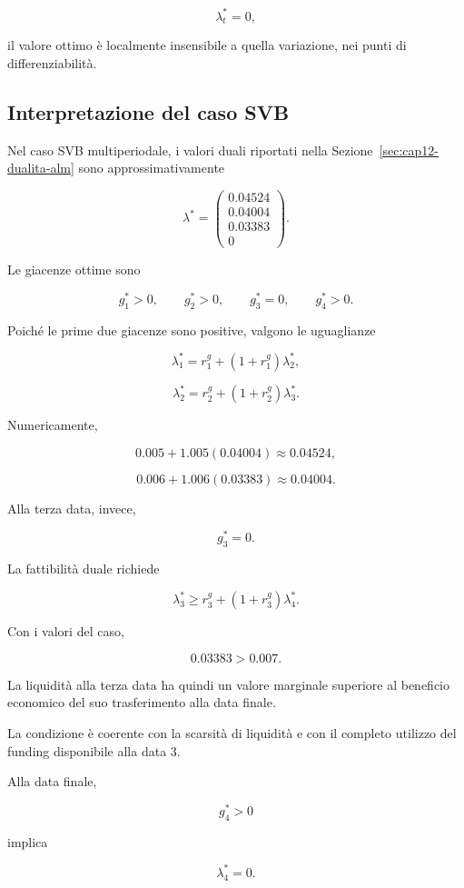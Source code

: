 \[
\lambda_t^*=0,
\]

\noindent il valore ottimo \`{e} localmente
insensibile a quella variazione,
nei punti di differenziabilit\`{a}.

\subsection{Interpretazione del caso SVB}

Nel caso SVB multiperiodale,
i valori duali riportati nella
Sezione~\ref{sec:cap12-dualita-alm}
sono approssimativamente

\[
\lambda^*
=
\begin{pmatrix}
0.04524\\
0.04004\\
0.03383\\
0
\end{pmatrix}.
\]

Le giacenze ottime sono

\[
g_1^*>0,\qquad
g_2^*>0,\qquad
g_3^*=0,\qquad
g_4^*>0.
\]

Poich\'{e} le prime due giacenze
sono positive, valgono le uguaglianze

\[
\lambda_1^*
=
r_1^g+(1+r_1^g)\lambda_2^*,
\]

\[
\lambda_2^*
=
r_2^g+(1+r_2^g)\lambda_3^*.
\]

Numericamente,

\[
0.005+1.005(0.04004)
\approx0.04524,
\]

\[
0.006+1.006(0.03383)
\approx0.04004.
\]

Alla terza data, invece,

\[
g_3^*=0.
\]

La fattibilit\`{a} duale richiede

\[
\lambda_3^*
\geq
r_3^g+(1+r_3^g)\lambda_4^*.
\]

Con i valori del caso,

\[
0.03383>0.007.
\]

La liquidit\`{a} alla terza data
ha quindi un valore marginale
superiore al beneficio economico
del suo trasferimento alla data finale.

La condizione \`{e} coerente
con la scarsit\`{a} di liquidit\`{a}
e con il completo utilizzo del
funding disponibile alla data $3$.

Alla data finale,

\[
g_4^*>0
\]

\noindent implica

\[
\lambda_4^*=0.
\]

